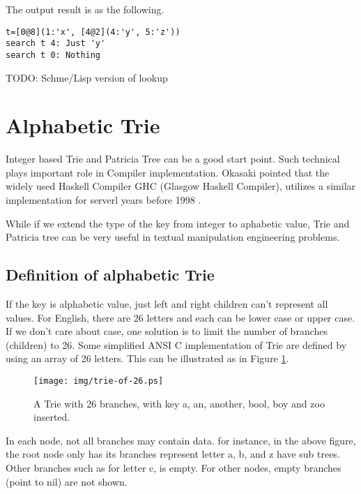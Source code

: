 \documentclass{article}
\begin{document}
The output result is as the following.

\begin{verbatim}
t=[0@8](1:'x', [4@2](4:'y', 5:'z'))
search t 4: Just 'y'
search t 0: Nothing
\end{verbatim}

TODO: Schme/Lisp version of lookup

\section{Alphabetic Trie}
Integer based Trie and Patricia Tree can be a good start point. Such
technical plays important role in Compiler implementation. Okasaki
pointed that the widely used Haskell Compiler GHC (Glasgow Haskell 
Compiler), utilizes a similar implementation for serverl years before
1998 \cite{okasaki-int-map}. 

While if we extend the type of the key from integer to aphabetic
value, Trie and Patricia tree can be very useful in textual manipulation
engineering problems.

\subsection{Definition of alphabetic Trie}
If the key is alphabetic value, just left and right children can't
represent all values. For English, there are 26 letters and each can
be lower case or upper case. If we don't care about case, one solution
is to limit the number of branches (children) to 26. Some simplified
ANSI C implementation of Trie are defined by using an array of 26
letters. This can be illustrated as in Figure \ref{fig:trie-of-26}.

\begin{figure}[htbp]
  \begin{center}
    \texttt{[image: img/trie-of-26.ps]}
      \caption{A Trie with 26 branches, with key a, an, another, bool,
    boy and zoo inserted.}
      \label{fig:trie-of-26}
  \end{center}
\end{figure}

In each node, not all branches may contain data. for instance, in the
above figure, the root node only has its branches represent letter a,
b, and z have sub trees. Other branches such as for letter c, is
empty. For other nodes, empty branches (point to nil) are not shown.
\end{document}
